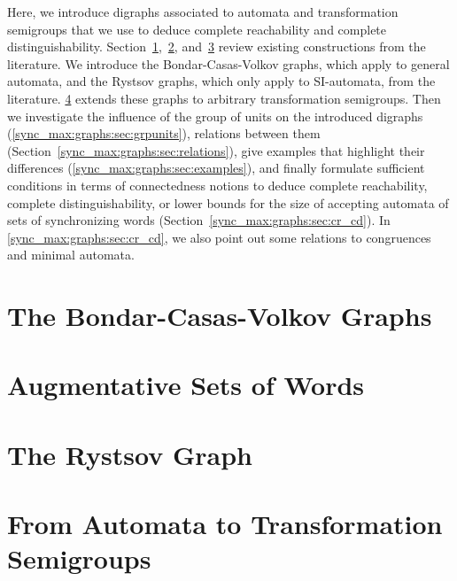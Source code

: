 
Here, we introduce digraphs
associated to automata and transformation semigroups 
that we use to deduce complete reachability and complete distinguishability.
Section~\ref{sync_max:sec:BVC-graphs},~\ref{sync_max:sec:augmentative}, and~\ref{sync_max:sec:rystsov_graph}
review existing constructions from the literature.
We introduce the Bondar-Casas-Volkov graphs, which apply to general automata, and the Rystsov graphs, which only apply to SI-automata,
from the literature.
\cref{sec:extended_Rystsov_graph} extends these graphs to arbitrary transformation semigroups.
Then we investigate the influence of the group of units
on the introduced digraphs (\cref{sync_max:graphs:sec:grpunits}),
relations between them (Section~\ref{sync_max:graphs:sec:relations}), give 
examples that highlight their differences (\cref{sync_max:graphs:sec:examples}), 
and finally formulate sufficient conditions in terms of connectedness notions to deduce
complete reachability, complete distinguishability, or
 lower bounds for the size of accepting automata of sets of synchronizing words (Section~\ref{sync_max:graphs:sec:cr_cd}).
 In \cref{sync_max:graphs:sec:cr_cd}, we also point out some
 relations to congruences and minimal automata.
 
 \section{The Bondar-Casas-Volkov Graphs}
\label{sync_max:sec:BVC-graphs} 



\section{Augmentative Sets of Words}
\label{sync_max:sec:augmentative}



\section{The Rystsov Graph}
\label{sync_max:sec:rystsov_graph} 



\section{From Automata to Transformation Semigroups}
\label{sec:extended_Rystsov_graph} 

